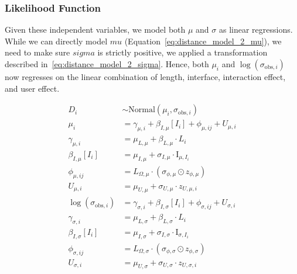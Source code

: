 \subsubsection{Likelihood Function}
Given these independent variables, we model both $\mu$ and $\sigma$ as linear regressions. While we can directly model $mu$ (Equation~\ref{eq:distance_model_2_mu}), we need to make sure $sigma$ is strictly positive, we applied a transformation described in~\ref{eq:distance_model_2_sigma}. Hence, both $\mu_i$ and $\log(\sigma_{\text{obs},i})$ now regresses on the linear combination of length, interface, interaction effect, and user effect. 

\begin{align}
    D_i &\sim \text{Normal}(\mu_i, \sigma_{\text{obs},i}) \label{eq:distance_model_2_likelihood} \\
    \mu_i &= \gamma_{\mu,i} + \beta_{I,\mu}[I_i] + \phi_{\mu,ij} + U_{\mu,i} \label{eq:distance_model_2_mu} \\
    \gamma_{\mu,i} &= \mu_{L,\mu} + \beta_{L,\mu} \cdot L_i \label{eq:distance_model_2_gamma_mu} \\
    \beta_{I,\mu}[I_i] &= \mu_{I,\mu} + \sigma_{I,\mu} \cdot \text{I}_{\mu,I_i} \label{eq:distance_model_2_beta_I_mu} \\
    \phi_{\mu,ij} &= L_{\Omega,\mu} \cdot (\sigma_{\phi,\mu} \odot z_{\phi,\mu}) \label{eq:distance_model_2_phi_mu} \\
    U_{\mu,i} &= \mu_{U,\mu} + \sigma_{U,\mu} \cdot z_{U,\mu,i} \label{eq:distance_model_2_user_mu} \\
    \log(\sigma_{\text{obs},i}) &= \gamma_{\sigma,i} + \beta_{I,\sigma}[I_i] + \phi_{\sigma,ij} + U_{\sigma,i} \label{eq:distance_model_2_sigma} \\
    \gamma_{\sigma,i} &= \mu_{L,\sigma} + \beta_{L,\sigma} \cdot L_i \label{eq:distance_model_2_gamma_sigma} \\
    \beta_{I,\sigma}[I_i] &= \mu_{I,\sigma} + \sigma_{I,\sigma} \cdot \text{I}_{\sigma,I_i} \label{eq:distance_model_2_beta_I_sigma} \\
    \phi_{\sigma,ij} &= L_{\Omega,\sigma} \cdot (\sigma_{\phi,\sigma} \odot z_{\phi,\sigma}) \label{eq:distance_model_2_phi_sigma} \\
    U_{\sigma,i} &= \mu_{U,\sigma} + \sigma_{U,\sigma} \cdot z_{U,\sigma,i} \label{eq:distance_model_2_user_sigma}
\end{align}

